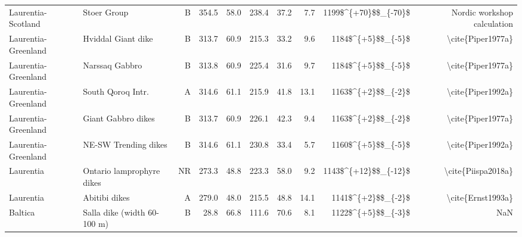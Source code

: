 \begin{longtable}{p{1 in}p{1 in}rrrrrrrr}
            Laurentia-Scotland &                                        Stoer Group &      B &     354.5 &      58.0 & 238.4 &  37.2 &       7.7 &   1199\$\textasciicircum \{+70\}\$\$\_\{-70\}\$ &                        Nordic workshop calculation \\
           Laurentia-Greenland &                                 Hviddal Giant dike &      B &     313.7 &      60.9 & 215.3 &  33.2 &       9.6 &     1184\$\textasciicircum \{+5\}\$\$\_\{-5\}\$ &                                  \textbackslash cite\{Piper1977a\} \\
           Laurentia-Greenland &                                     Narssaq Gabbro &      B &     313.8 &      60.9 & 225.4 &  31.6 &       9.7 &     1184\$\textasciicircum \{+5\}\$\$\_\{-5\}\$ &                                  \textbackslash cite\{Piper1977a\} \\
           Laurentia-Greenland &                                  South Qoroq Intr. &      A &     314.6 &      61.1 & 215.9 &  41.8 &      13.1 &     1163\$\textasciicircum \{+2\}\$\$\_\{-2\}\$ &                                  \textbackslash cite\{Piper1992a\} \\
           Laurentia-Greenland &                                 Giant Gabbro dikes &      B &     313.7 &      60.9 & 226.1 &  42.3 &       9.4 &     1163\$\textasciicircum \{+2\}\$\$\_\{-2\}\$ &                                  \textbackslash cite\{Piper1977a\} \\
           Laurentia-Greenland &                               NE-SW Trending dikes &      B &     314.6 &      61.1 & 230.8 &  33.4 &       5.7 &     1160\$\textasciicircum \{+5\}\$\$\_\{-5\}\$ &                                  \textbackslash cite\{Piper1992a\} \\
                     Laurentia &                          Ontario lamprophyre dikes &     NR &     273.3 &      48.8 & 223.3 &  58.0 &       9.2 &   1143\$\textasciicircum \{+12\}\$\$\_\{-12\}\$ &                                 \textbackslash cite\{Piispa2018a\} \\
                     Laurentia &                                      Abitibi dikes &      A &     279.0 &      48.0 & 215.5 &  48.8 &      14.1 &     1141\$\textasciicircum \{+2\}\$\$\_\{-2\}\$ &                                  \textbackslash cite\{Ernst1993a\} \\
                       Baltica &                        Salla dike (width 60-100 m) &      B &      28.8 &      66.8 & 111.6 &  70.6 &       8.1 &     1122\$\textasciicircum \{+5\}\$\$\_\{-3\}\$ &                                                NaN \\

\end{longtable}
